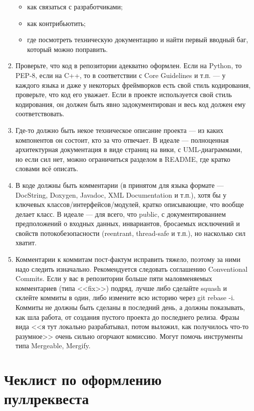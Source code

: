 \documentclass[a5paper]{article}
\begin{document}
\begin{enumerate}
\begin{itemize}
        \item как связаться с разработчиками;
        \item как контрибьютить;
        \item где посмотреть техническую документацию и найти первый вводный баг, который можно поправить.
    \end{itemize}
    \item Проверьте, что код в репозитории адекватно оформлен. Если на Python, то PEP-8, если на C++, то в соответствии с Core Guidelines и т.п. --- у каждого языка и даже у некоторых фреймворков есть свой стиль кодирования, проверьте, что код его уважает. Если в проекте используется свой стиль кодирования, он должен быть явно задокументирован и весь код должен ему соответствовать.
    \item Где-то должно быть некое техническое описание проекта --- из каких компонентов он состоит, кто за что отвечает. В идеале --- полноценная архитектурная документация в виде страниц на вики, с UML-диаграммами, но если сил нет, можно ограничиться разделом в README, где кратко словами всё описать.
    \item В коде должны быть комментарии (в принятом для языка формате --- DocString, Doxygen, Javadoc, XML Documentation и т.п.), хотя бы у ключевых классов/интерфейсов/модулей, кратко описывающие, что вообще делает класс. В идеале --- для всего, что public, с документированием предположений о входных данных, инвариантов, бросаемых исключений и свойств потокобезопасности (reentrant, thread-safe и т.п.), но насколько сил хватит.
    \item Комментарии к коммитам пост-фактум исправить тяжело, поэтому за ними надо следить изначально. Рекомендуется следовать соглашению Conventional Commits. Если у вас в репозитории больше пяти маловменяемых комментариев (типа <<fix>>) подряд, лучше либо сделайте squash и склейте коммиты в один, либо измените всю историю через git rebase -i. Коммиты не должны быть сделаны в последний день, а должны показывать, как шла работа, от создания пустого проекта до последнего релиза. Фразы вида <<я тут локально разрабатывал, потом выложил, как получилось что-то разумное>> очень сильно огорчают комиссию. Могут помочь инструменты типа Mergeable, Mergify.
\end{enumerate}

\section*{Чеклист по оформлению пуллреквеста}
\end{document}
